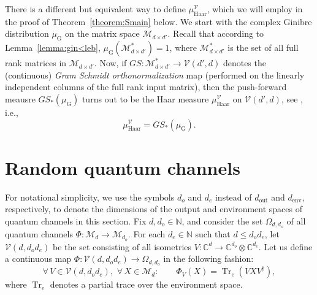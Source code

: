 \documentclass[a4paper,onecolumn,10pt,accepted=2022-07-11]{quantumarticle}
\newcommand{\M}[1]{\mathcal{M}_{#1}}
\newcommand{\C}[1]{\mathbb{C}^{#1}}
\newcommand{\env}{\operatorname{env}}
\newcommand{\out}{\operatorname{out}}
\newcommand{\gin}{\operatorname{G}}
\newcommand{\haar}{\operatorname{Haar}}
\theoremstyle{definition}
\begin{document}
There is a different but equivalent way to define $\mu^{\mathcal{V}}_{\operatorname{Haar}}$, which we will employ in the proof of Theorem~\ref{theorem:Smain} below. We start with the complex Ginibre distribution $\mu_{\gin}$ on the matrix space $\M{d\times d'}$. Recall that according to Lemma~\ref{lemma:gin<leb}, $\mu_{\gin}(\mathcal{M}^*_{d\times d'})=1$, where $\mathcal{M}^*_{d\times d'}$ is the set of all full rank matrices in $\M{d\times d'}$. Now, if $GS : \mathcal{M}^*_{d\times d'} \to \mathcal{V}(d',d)$ denotes the (continuous) \emph{Gram Schmidt orthonormalization} map (performed on the linearly independent columns of the full rank input matrix), then the push-forward meausre $GS_*(\mu_{\gin})$ turns out to be the Haar measure $\mu^{\mathcal{V}}_{\haar}$ on $\mathcal{V}(d',d)$, see \cite[Sections 4 and 5]{mezzadri2007random}, i.e.,
\begin{equation}\label{eq:Vhaar2}
    \mu^{\mathcal{V}}_{\haar} = GS_*(\mu_{\gin}).
\end{equation}

\section{Random quantum channels} \label{appen:rc} For notational simplicity, we use the symbols $d_o$ and $d_e$ instead of $d_{\out}$ and $d_{\env}$, respectively, to denote the dimensions of the output and environment spaces of quantum channels in this section. Fix $d, d_o \in {\mathbb{N}}$, and consider the set $\Omega_{d,d_o}$ of all quantum channels $\Phi:\M{d}\to\M{d_o}$. For each $d_e\in\mathbb{N}$ such that $d\leq d_od_e$, let $\mathcal{V}(d,d_od_e)$ be the set consisting of all isometries $V:\C{d}\to \C{d_o}\otimes \C{d_e}$. Let us define a continuous map $\Phi:\mathcal{V}(d,d_od_e)\to \Omega_{d,d_o}$ in the following fashion: 
\begin{equation}\label{eq:phi}
\forall \, V\in \mathcal{V}(d,d_od_e), \,\, \forall \, X\in\M{d}: \qquad \Phi_V (X) = \operatorname{Tr}_e (VXV^\dagger),
\end{equation}
where $\operatorname{Tr}_{e}$ denotes a partial trace over the environment space.
\end{document}
